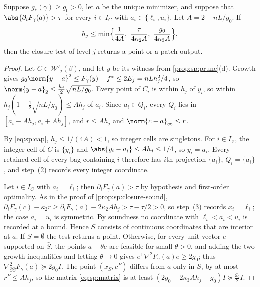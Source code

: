 \begin{proposition}\label{prop:sp:closure-stop}
Suppose $g_*(\gamma)\ge g_0>0$, let $a$ be the unique minimizer, and suppose
that $\abs{\partial_iF_\gamma(a)}>\tau$ for every $i\in I_C$ with
$a_i\in\{\ell_i,u_i\}$. Let $A=2+nL/g_0$. If
\begin{equation}\label{eq:sp:cap}
 h_j\le\min\Bigl\{\frac1{4A},\ \frac{\tau}{4\kappa_2A},\
 \frac{g_0}{4\kappa_3A}\Bigr\},
\end{equation}
then the closure test of level $j$ returns a point or a patch output.
\end{proposition}

\begin{proof}
Let $C\in\mathcal W'_j(\beta)$, and let $y$ be its witness from
\cref{prop:sp:prune}(d). Growth gives $g_0\norm{y-a}^2\le F_\gamma(y)-f^*\le
2E_j=nLh_j^2/4$, so $\norm{y-a}_2\le\frac{h_j}2\sqrt{nL/g_0}$. Every point of
$C_i$ is within $h_j$ of $y_i$, so within
$h_j(1+\frac12\sqrt{nL/g_0})\le Ah_j$ of $a_i$. Since $a_i\in Q_i$, every
$Q_i$ lies in $[a_i-Ah_j,a_i+Ah_j]$, and $r\le Ah_j$ and
$\norm{c-a}_\infty\le r$.

By \eqref{eq:sp:cap}, $h_j\le1/(4A)<1$, so integer cells are singletons.
For $i\in I_Z$, the integer cell of $C$ is $\{y_i\}$ and
$\abs{y_i-a_i}\le Ah_j\le1/4$, so $y_i=a_i$. Every retained cell of every bag
containing $i$ therefore has $i$th projection $\{a_i\}$, $Q_i=\{a_i\}$, and
step~(2) records every integer coordinate.

Let $i\in I_C$ with $a_i=\ell_i$; then $\partial_iF_\gamma(a)>\tau$ by
hypothesis and first-order optimality. As in the proof of
\cref{prop:sp:closure-sound},
$\partial_iF_\gamma(c)-\kappa_2r\ge\partial_iF_\gamma(a)-2\kappa_2Ah_j>\tau-\tau/2>0$,
so step~(3) records $\bar x_i=\ell_i$; the case $a_i=u_i$ is symmetric. By
soundness no coordinate with $\ell_i<a_i<u_i$ is recorded at a bound. Hence
$\bar S$ consists of continuous coordinates that are interior at $a$. If
$\bar S=\emptyset$ the test returns a point. Otherwise, for every unit vector
$e$ supported on $\bar S$, the points $a\pm\theta e$ are feasible for small
$\theta>0$, and adding the two growth inequalities and letting
$\theta\to0$ gives $e^{\mathsf T}\nabla^2F_\gamma(a)e\ge2g_0$; thus
$\nabla^2_{\bar S\bar S}F_\gamma(a)\succeq2g_0I$. The point $(\bar x_S,c^P)$
differs from $a$ only in $\bar S$, by at most $r^P\le Ah_j$, so the matrix
\eqref{eq:sp:matrix} is at least
$(2g_0-2\kappa_3Ah_j-g_0)I\succeq\frac{g_0}2I$.
\end{proof}

